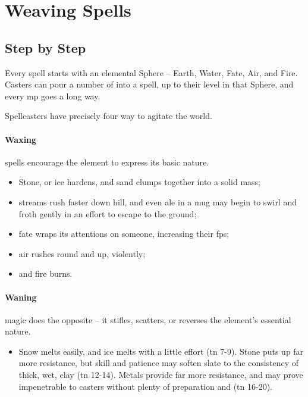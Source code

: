 \section{Weaving Spells}

\begin{multicols}{2}

\begin{figure*}[t!]
  \centering
  \speltogram
  \label{speltogram}
\end{figure*}

\subsection{Step by Step}


Every spell starts with an elemental Sphere -- Earth, Water, Fate, Air, and Fire.
Casters can pour a number of  into a spell, up to their level in that Sphere, and every \gls{mp} goes a long way.

Spellcasters have precisely four way to agitate the world.

\paragraph{Waxing}
spells encourage the element to express its basic nature.

\begin{itemize}
  \item
  Stone, or ice hardens, and sand clumps together into a solid mass;
  \item
  streams rush faster down hill, and even ale in a mug may begin to swirl and froth gently in an effort to escape to the ground;
  \item
  fate wraps its attentions on someone, increasing their \glspl{fp};
  \item
  air rushes round and up, violently;
  \item
  and fire burns.
\end{itemize}

\paragraph{Waning}
magic does the opposite -- it stifles, scatters, or reverses the element's essential nature.

\begin{itemize}
  \item
  Snow melts easily, and ice melts with a little effort (\gls{tn} 7-9).
  Stone puts up far more resistance, but skill and patience may soften slate to the consistency of thick, wet, clay (\gls{tn} 12-14).
  Metals provide far more resistance, and may prove impenetrable to casters without plenty of preparation and  (\gls{tn} 16-20).


\end{itemize}
\end{multicols}
